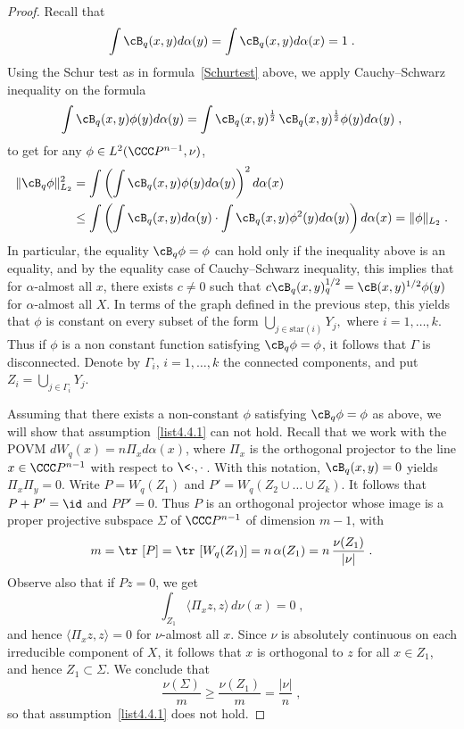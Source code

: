 \begin{proof}
Recall that
\[
\int \cB_q(x,y) d\alpha(y) = \int \cB_q(x,y) d\alpha(x)=1\;.
\]
Using the Schur test as in formula~\eqref{Schurtest} above, we apply Cauchy--Schwarz inequality on the formula
\begin{equation}\label{CS1/2}
\int\cB_q(x,y)\phi(y)d\alpha(y) =
\int \cB_q(x,y)^{\frac{1}{2}}\, \cB_q(x,y)^{\frac{1}{2}}\phi(y) d\alpha(y)\;,
\end{equation}
to get for any $\phi\in L^2(\CCC P^{n-1},\nu)$,
\begin{equation}
\begin{split}
\|\cB_q\phi\|^2_{L_2} &= \int \left (\int \cB_q(x,y)\phi(y) d\alpha(y)\right) ^2 d\alpha(x)\\
&\leq \int \left (\int \cB_q(x,y) d\alpha(y) \cdot \int \cB_q(x,y)
\phi^2(y)d\alpha(y) \right) d\alpha(x) =\|\phi\|_{L_2}\;.
\end{split}
\end{equation}
In particular, the equality $\cB_q\phi=\phi$ can hold only if the inequality above is an equality, and by the equality case of Cauchy--Schwarz inequality, this implies that for $\alpha$-almost all $x$, there exists $c \neq 0$ such that $c\cB_q(x,y)^{1/2}_q= \cB(x,y)^{1/2}\phi(y)$ for $\alpha$-almost all $X$. In terms of the graph defined in the previous step, this yields that $\phi$ is constant on every subset of the form $\bigcup_{j \in \text{star}(i)} Y_j,$ where $i=1,\dots,k$. Thus if $\phi$ is a non constant function satisfying $\cB_q\phi=\phi$, it follows that $\Gamma$ is disconnected. Denote by $\Gamma_i$, $i=1,\dots,k$ the connected components, and put $Z_i= \bigcup_{j \in \Gamma_i} Y_j$.


Assuming that there exists a non-constant $\phi$ satisfying $\cB_q\phi=\phi$ as above, we will show that assumption~\eqref{list4.4.1} can not hold. Recall that we work with the POVM $dW_q(x) = n \Pi_x d\alpha(x)$, where $\Pi_x$ is the orthogonal projector to the line $x \in \CCC P^{n-1}$ with respect to $\<\cdot,\cdot\>$. With this notation, $\cB_q(x,y)=0$ yields $\Pi_x\Pi_y = 0$. Write $P = W_q(Z_1)$ and $P' = W_q(Z_2 \cup \dots \cup Z_k)$. It follows that $P+P'=\id$ and $PP' = 0$. Thus $P$ is an orthogonal projector whose image is a proper projective subspace $\Sigma$ of $\CCC P^{n-1}$ of dimension $m-1$, with
\[
m = \tr\,\left[P\right] = \tr\,\left[W_q(Z_1)\right]
= n\,\alpha(Z_1)
= n\,\frac{\nu(Z_1)}{|\nu|}\;.
\]
Observe also that if $Pz=0$, we get
\[
\int_{Z_1} \langle \Pi_x z,z \rangle\, d\nu(x) =0\;,
\]
and hence $\langle \Pi_x z,z\rangle = 0$ for $\nu$-almost all $x$. Since $\nu$ is absolutely continuous on each irreducible component of $X$, it follows that $x$ is orthogonal to $z$ for all $x \in Z_1$, and hence $Z_1 \subset \Sigma$. We conclude that
\[
\frac{\nu(\Sigma)}{m} \geq \frac{\nu(Z_1)}{m}= \frac{|\nu|}{n}\;,
\]
so that assumption~\eqref{list4.4.1} does not hold.
\end{proof}

